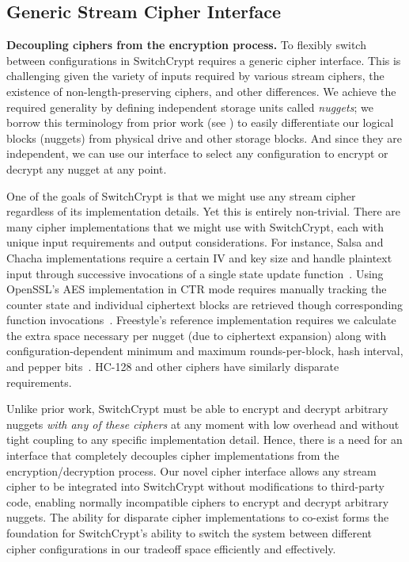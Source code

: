 


\subsection{Generic Stream Cipher Interface} \label{subsec:interface}



\textbf{Decoupling ciphers from the encryption process.} To flexibly switch
between configurations in SwitchCrypt requires a generic cipher interface. This
is challenging given the variety of inputs required by various stream ciphers,
the existence of non-length-preserving ciphers, and other differences. We
achieve the required generality by defining independent storage units called
\emph{nuggets}; we borrow this terminology from prior work (see
\cite{StrongBox}) to easily differentiate our logical blocks (nuggets) from
physical drive and other storage blocks. And since they are independent, we can
use our interface to select any configuration to encrypt or decrypt any nugget
at any point.



One of the goals of SwitchCrypt is that we might use any stream cipher
regardless of its implementation details. Yet this is entirely non-trivial.
There are many cipher implementations that we might use with SwitchCrypt, each
with unique input requirements and output considerations. For instance, Salsa
and Chacha implementations require a certain IV and key size and handle
plaintext input through successive invocations of a single state update
function~\cite{Floodyberry}. Using OpenSSL's AES implementation in CTR mode
requires manually tracking the counter state and individual ciphertext blocks
are retrieved though corresponding function invocations~\cite{OpenSSL}.
Freestyle's reference implementation requires we calculate the extra space
necessary per nugget (due to ciphertext expansion) along with
configuration-dependent minimum and maximum rounds-per-block, hash interval, and
pepper bits~\cite{Freestyle}. HC-128 and other ciphers have similarly disparate
requirements.

Unlike prior work, SwitchCrypt must be able to encrypt and decrypt arbitrary
nuggets \emph{with any of these ciphers} at any moment with low overhead and
without tight coupling to any specific implementation detail. Hence, there is a
need for an interface that completely decouples cipher implementations from the
encryption/decryption process. Our novel cipher interface allows any stream
cipher to be integrated into SwitchCrypt without modifications to third-party
code, enabling normally incompatible ciphers to encrypt and decrypt arbitrary
nuggets. The ability for disparate cipher implementations to co-exist forms the
foundation for SwitchCrypt's ability to switch the system between different
cipher configurations in our tradeoff space efficiently and effectively.

